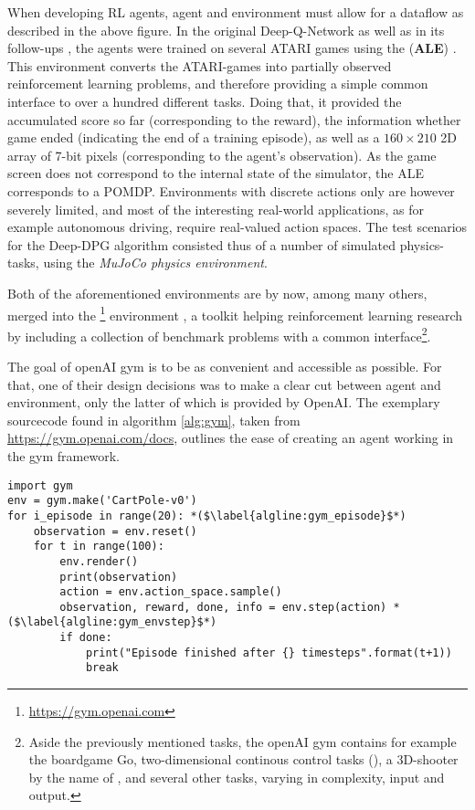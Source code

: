 When developing RL agents, agent and environment must allow for a dataflow as described in the above figure. In the original Deep-Q-Network \cite{mnih_playing_2013} as well as in its follow-ups \cite{van_hasselt_deep_2015, wang_dueling_2015}, the agents were trained on several ATARI games using the  (\textbf{ALE}) \cite{bellemare_arcade_2012}. This environment converts the ATARI-games into partially observed reinforcement learning problems, and therefore providing a simple common interface to over a hundred different tasks. Doing that, it provided the accumulated score so far (corresponding to the reward), the information whether game ended (indicating the end of a training episode), as well as a $160 \times 210$  2D array of 7-bit pixels (corresponding to the agent's observation). As the game screen does not correspond to the internal state of the simulator, the ALE corresponds to a POMDP. Environments with discrete actions only are however severely limited, and most of the interesting real-world applications, as for example autonomous driving, require real-valued action spaces. The test scenarios for the Deep-DPG algorithm consisted thus of a number of simulated physics-tasks, using the \textit{MuJoCo physics environment}. 

Both of the aforementioned environments are by now, among many others, merged into the \footnote{\url{https://gym.openai.com}} environment \cite{brockman_openai_2016}, a toolkit helping reinforcement learning research by including a collection of benchmark problems with a common interface\footnote{Aside the previously mentioned tasks, the openAI gym contains for example the boardgame Go, two-dimensional continous control tasks (), a 3D-shooter by the name of , and several other tasks, varying in complexity, input and output.}.

The goal of openAI gym is to be as convenient and accessible as possible. For that, one of their design decisions was to make a clear cut between agent and environment, only the latter of which is provided by OpenAI. The exemplary sourcecode found in algorithm \ref{alg:gym}, taken from \url{https://gym.openai.com/docs}, outlines the ease of creating an agent working in the gym framework.
\begin{algorithm}[h]
\begin{lstlisting}[style=Python]
import gym
env = gym.make('CartPole-v0')
for i_episode in range(20): *($\label{algline:gym_episode}$*)
	observation = env.reset()
	for t in range(100):
		env.render()
		print(observation)
		action = env.action_space.sample()
		observation, reward, done, info = env.step(action) *($\label{algline:gym_envstep}$*)
		if done:
			print("Episode finished after {} timesteps".format(t+1))
			break
\end{lstlisting}%
\caption{Interaction with the openAI gym environment}
\label{alg:gym}
\end{algorithm}


